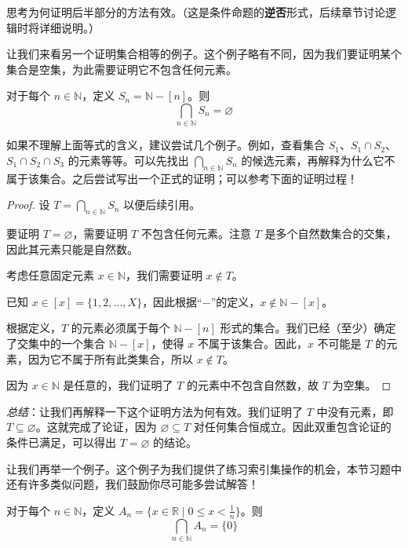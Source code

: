 思考为何证明后半部分的方法有效。（这是条件命题的\textbf{逆否}形式，后续章节讨论逻辑时将详细说明。）

让我们来看另一个证明集合相等的例子。这个例子略有不同，因为我们要证明某个集合是空集，为此需要证明它不包含任何元素。

\begin{proposition}
    对于每个 $n \in \mathbb{N}$，定义 $S_n = \mathbb{N}-[n]$。则
    \[\bigcap_{n \in \mathbb{N}}S_n = \varnothing\]
\end{proposition}

如果不理解上面等式的含义，建议尝试几个例子。例如，查看集合 $S_1$、$S_1 \cap S_2$、$S_1 \cap S_2 \cap S_3$ 的元素等等。可以先找出 $\bigcap_{n \in \mathbb{N}}S_n$ 的候选元素，再解释为什么它不属于该集合。之后尝试写出一个正式的证明；可以参考下面的证明过程！

\begin{proof}
    设 $T = \bigcap_{n \in \mathbb{N}}S_n$ 以便后续引用。

    要证明 $T = \varnothing$，需要证明 $T$ 不包含任何元素。注意 $T$ 是多个自然数集合的交集，因此其元素只能是自然数。

    考虑任意固定元素 $x \in \mathbb{N}$，我们需要证明 $x \notin T$。

    已知 $x \in [x] = \{1,2,\dots, X\}$，因此根据``$-$''的定义，$x \notin \mathbb{N}-[x]$。

    根据定义，$T$ 的元素必须属于每个 $\mathbb{N} - [n]$ 形式的集合。我们已经（至少）确定了交集中的一个集合 $\mathbb{N} - [x]$，使得 $x$ 不属于该集合。因此，$x$ 不可能是 $T$ 的元素，因为它不属于所有此类集合，所以 $x \notin T$。

    因为 $x \in \mathbb{N}$ 是任意的，我们证明了 $T$ 的元素中不包含自然数，故 $T$ 为空集。
\end{proof}

\emph{总结}：让我们再解释一下这个证明方法为何有效。我们证明了 $T$ 中没有元素，即 $T \subseteq \varnothing$。这就完成了论证，因为 $\varnothing \subseteq T$ 对任何集合恒成立。因此双重包含论证的条件已满足，可以得出 $T = \varnothing$ 的结论。

让我们再举一个例子。这个例子为我们提供了练习索引集操作的机会，本节习题中还有许多类似问题，我们鼓励你尽可能多尝试解答！

\begin{proposition}
    对于每个 $n \in \mathbb{N}$，定义 $A_n = \{x \in \mathbb{R} \mid 0 \le x < \frac{1}{n}\}$。则
    \[\bigcap_{n \in \mathbb{N}}A_n = \{0\}\]
\end{proposition}

